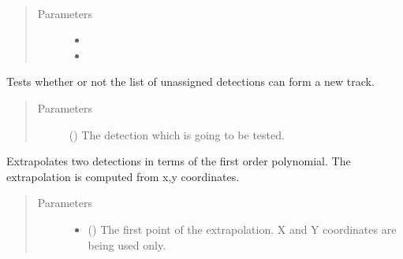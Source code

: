 \documentclass[letterpaper,10pt,english]{sphinxmanual}
\begin{document}
\begin{fulllineitems}
\label{\detokenize{datacontainers:data_containers.UnAssignedDetectionList}}~\begin{quote}\begin{description}
\item[{Parameters}] \leavevmode\begin{itemize}
\item {} 
 \textendash{} 

\item {} 
 \textendash{} 

\end{itemize}

\end{description}\end{quote}

\begin{fulllineitems}
\label{\detokenize{datacontainers:data_containers.UnAssignedDetectionList.new_detection}}
Tests whether or not the list of unassigned detections can form a new track.
\begin{quote}\begin{description}
\item[{Parameters}] \leavevmode
{} ({\hyperref[\detokenize{datacontainers:data_containers.DetectionPoint}]{}}) \textendash{} The detection which is going to be tested.

\end{description}\end{quote}

\end{fulllineitems}


\begin{fulllineitems}
\label{\detokenize{datacontainers:data_containers.UnAssignedDetectionList.two_point_projection}}
Extrapolates two detections in terms of the first order polynomial.
The extrapolation is computed from x,y coordinates.
\begin{quote}\begin{description}
\item[{Parameters}] \leavevmode\begin{itemize}
\item {} 
 ({\hyperref[\detokenize{datacontainers:data_containers.DetectionPoint}]{}}) \textendash{} The first point of the extrapolation. X and Y coordinates are being used only.


\end{itemize}
\end{description}
\end{quote}
\end{fulllineitems}
\end{fulllineitems}
\end{document}
